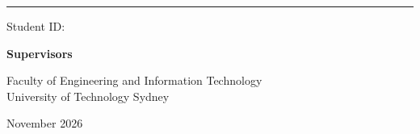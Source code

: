 \begin{titlepage}
  \centering
  \setlength{\parskip}{0pt}
  {\LARGE\bfseries\color{accent} \thesistitle\par}
  \vspace{1.5em}
  {\color{accent!40}\rule{0.4\textwidth}{0.8pt}\par}
  \vspace{1.5em}
  {\Large \thesisauthor\par}
  \vspace{0.3em}
  {\large Student ID: \studentid\par}
  \vspace{0.5em}
  {\large\itshape \thesisdegree\par}
  {\large\bfseries Supervisors\par}
  \vspace{0.6em}
  \newcommand{\supervisor}[2]{{\large #1\par}{\small\itshape #2\par}\vspace{0.6em}}
  \supervisors
  {\large Faculty of Engineering and Information Technology\\ University of Technology Sydney\par}
  \vspace{0.8em}
  {\large November 2026\par}
\end{titlepage}
